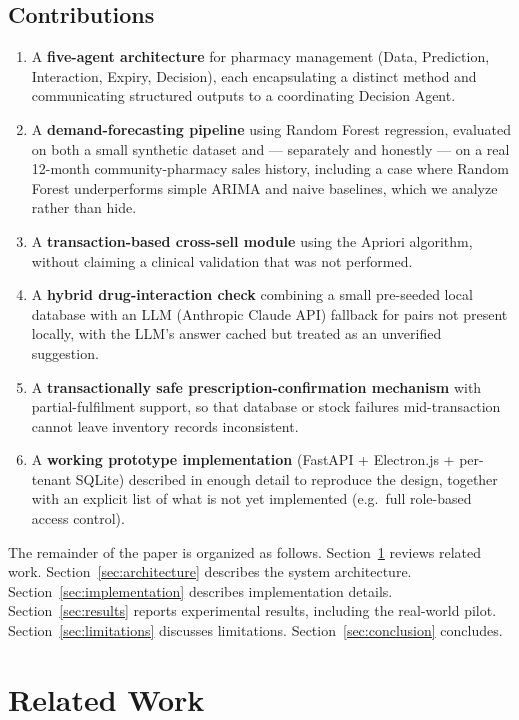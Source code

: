 \documentclass[12pt,a4paper]{article}
\begin{document}
\subsection*{Contributions}
\begin{enumerate}[leftmargin=*]
    \item A \textbf{five-agent architecture} for pharmacy management (Data, Prediction, Interaction, Expiry, Decision), each encapsulating a distinct method and communicating structured outputs to a coordinating Decision Agent.
    \item A \textbf{demand-forecasting pipeline} using Random Forest regression, evaluated on both a small synthetic dataset and --- separately and honestly --- on a real 12-month community-pharmacy sales history, including a case where Random Forest underperforms simple ARIMA and naive baselines, which we analyze rather than hide.
    \item A \textbf{transaction-based cross-sell module} using the Apriori algorithm, without claiming a clinical validation that was not performed.
    \item A \textbf{hybrid drug-interaction check} combining a small pre-seeded local database with an LLM (Anthropic Claude API) fallback for pairs not present locally, with the LLM's answer cached but treated as an unverified suggestion.
    \item A \textbf{transactionally safe prescription-confirmation mechanism} with partial-fulfilment support, so that database or stock failures mid-transaction cannot leave inventory records inconsistent.
    \item A \textbf{working prototype implementation} (FastAPI + Electron.js + per-tenant SQLite) described in enough detail to reproduce the design, together with an explicit list of what is not yet implemented (e.g.\ full role-based access control).
\end{enumerate}

The remainder of the paper is organized as follows. Section~\ref{sec:related} reviews related work. Section~\ref{sec:architecture} describes the system architecture. Section~\ref{sec:implementation} describes implementation details. Section~\ref{sec:results} reports experimental results, including the real-world pilot. Section~\ref{sec:limitations} discusses limitations. Section~\ref{sec:conclusion} concludes.

\section{Related Work}
\label{sec:related}
\end{document}
